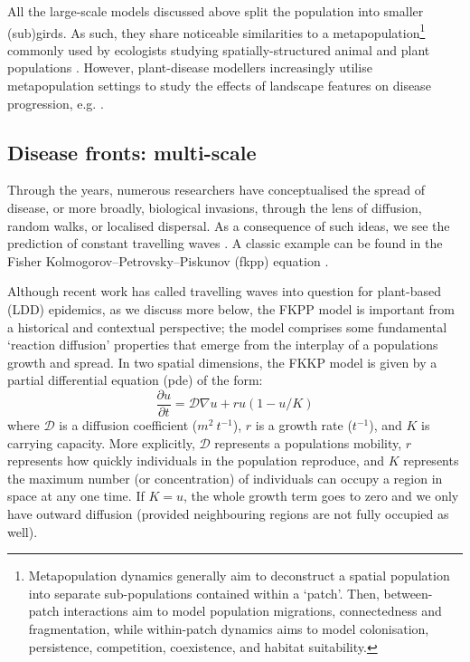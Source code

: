 All the large-scale models discussed above split the population into smaller (sub)girds.
As such, they share noticeable similarities to a metapopulation\footnote{
Metapopulation dynamics generally aim to deconstruct a spatial population into separate sub-populations
contained within a `patch'. Then, between-patch interactions aim to model population migrations, 
connectedness and fragmentation, while within-patch dynamics aims to model colonisation, persistence,
competition, coexistence, and habitat suitability.} commonly used by ecologists studying spatially-structured
animal and plant populations \cite{hanski1998metapopulation}. However, plant-disease modellers increasingly
utilise metapopulation settings to study the effects of landscape features on disease progression,
e.g. \cite{beninca2020trade, soubeyrand2009spatiotemporal, doi:10.1046/j.1461-0248.2002.00378.x}.

\subsection{Disease fronts: multi-scale}

Through the years, numerous researchers have conceptualised the spread of disease, or more broadly, biological invasions, 
through the lens of diffusion, random walks, or localised dispersal. As a consequence of such ideas, we see the prediction
of constant travelling waves \cite{skellam1951random, mollison1977spatial, GRASSBERGER1983157, ferrandino1993dispersive}.
A classic example can be found in the Fisher Kolmogorov–Petrovsky–Piskunov (\acrshort{fkpp}) equation \cite{fisher1937wave}.

Although recent work has called travelling waves into question for plant-based (LDD) epidemics, as we discuss more below, 
the FKPP model is important from a historical and contextual perspective;
the model comprises some fundamental `reaction diffusion' properties that emerge from the interplay of a populations growth and spread.
In two spatial dimensions, the FKKP model is given by a partial differential equation (\acrshort{pde}) of the form:
\begin{equation}
\label{eq:fkpp}
    \frac{\partial u}{\partial t} = \mathcal{D}\nabla u + ru(1 - u/K)
\end{equation}
where $\mathcal{D}$ is a diffusion coefficient ($m^2\ t^{-1}$), $r$ is a growth rate ($t^{-1}$),
and $K$ is carrying capacity. More explicitly, $\mathcal{D}$ represents a populations mobility, 
$r$ represents how quickly individuals in the population reproduce, and $K$ represents 
the maximum number (or concentration) of individuals can occupy a region in space at any one time.
If $K=u$, the whole growth term goes to zero and we only have outward diffusion (provided neighbouring
regions are not fully occupied as well). 

